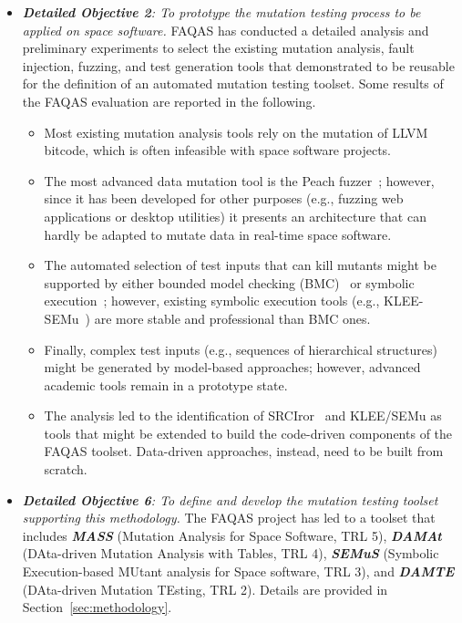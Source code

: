 \begin{itemize}
\item {\emph{\textbf{Detailed Objective 2}: To prototype the mutation testing process to be applied on space software.}}
FAQAS has conducted a detailed analysis and preliminary experiments to select the existing mutation analysis, fault injection, fuzzing, and test generation tools that demonstrated to be reusable for the definition of an automated mutation testing toolset. Some results of the FAQAS evaluation are reported in the following. 
\begin{itemize}
\item	Most existing mutation analysis tools rely on the mutation of LLVM~\cite{LLVM} bitcode, which is often infeasible with space software projects. 
\item The most advanced data mutation tool is the Peach fuzzer~\cite{PeachMozilla}; however, since it has been developed for other purposes (e.g., fuzzing web applications or desktop utilities) it presents an architecture that can hardly be adapted to mutate data in real-time space software. 
\item The automated selection of test inputs that can kill mutants might be supported by either bounded model checking (BMC)~\cite{CBMC} or symbolic execution~\cite{cadar2008klee}; however, existing symbolic execution tools (e.g., KLEE-SEMu~\cite{SEMU}) are more stable and professional than BMC ones. 
\item Finally, complex test inputs (e.g., sequences of hierarchical structures) might be generated by model-based approaches; however, advanced academic tools remain in a prototype state. 
\item The analysis led to the identification of SRCIror~\cite{hariri2018srciror} and KLEE/SEMu as tools that might be extended to build the code-driven components of the FAQAS toolset. Data-driven approaches, instead, need to be built from scratch.
\end{itemize}

\item {\emph{\textbf{Detailed Objective 6}: To define and develop the mutation testing toolset supporting this methodology.}} The FAQAS project has led to a toolset that includes \textbf{\emph{MASS}} (Mutation Analysis for Space Software, TRL 5), 
\textbf{\emph{DAMAt}} (DAta-driven Mutation Analysis with Tables, TRL 4), 
\textbf{\emph{SEMuS}} (Symbolic Execu\-tion-based MUtant analysis for Space software, TRL 3),
and \textbf{\emph{DAMTE}} (DAta-driven Mutation TEsting, TRL 2). 
Details are provided in Section~\ref{sec:methodology}.



\end{itemize}
